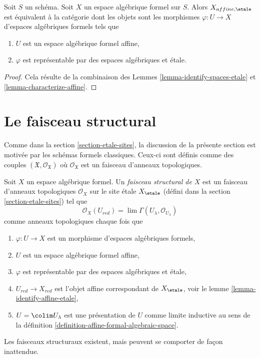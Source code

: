 \begin{lemma}
\label{lemma-identify-affine-etale}
Soit $S$ un schéma. Soit $X$ un espace algébrique formel sur $S$.
Alors $X_{affine, \etale}$ est équivalent à la catégorie dont les objets
sont les morphismes $\varphi : U \to X$ d'espaces algébriques formels tels que
\begin{enumerate}
\item $U$ est un espace algébrique formel affine,
\item $\varphi$ est représentable par des espaces algébriques et \'etale.
\end{enumerate}
\end{lemma}

\begin{proof}
Cela résulte de la combinaison des Lemmes \ref{lemma-identify-spaces-etale} et
\ref{lemma-characterize-affine}.
\end{proof}






\section{Le faisceau structural}
\label{section-structure-sheaf}


\noindent
Comme dans la section \ref{section-etale-sites}, la discussion de la présente
section est motivée par les schémas formels classiques. Ceux-ci sont définis comme des couples
$(\mathfrak X, \mathcal{O}_\mathfrak X)$ où $\mathcal{O}_\mathfrak X$
est un faisceau d'anneaux topologiques.

\medskip\noindent
Soit $X$ un espace algébrique formel. Un {\it faisceau structural de $X$}
est un faisceau d'anneaux topologiques $\mathcal{O}_X$ sur le site \'etale
$X_\etale$ (défini dans la section \ref{section-etale-sites}) tel que
$$
\mathcal{O}_X(U_{red}) = \lim \Gamma(U_\lambda, \mathcal{O}_{U_\lambda})
$$
comme anneaux topologiques chaque fois que
\begin{enumerate}
\item $\varphi : U \to X$ est un morphisme d'espaces algébriques formels,
\item $U$ est un espace algébrique formel affine,
\item $\varphi$ est représentable par des espaces algébriques et \'etale,
\item $U_{red} \to X_{red}$ est l'objet affine correspondant de
$X_\etale$, voir le
lemme \ref{lemma-identify-affine-etale},
\item $U = \colim U_\lambda$ est une présentation de $U$ comme limite inductive au sens de la
définition \ref{definition-affine-formal-algebraic-space}.
\end{enumerate}
Les faisceaux structuraux existent, mais peuvent se comporter de façon inattendue.

